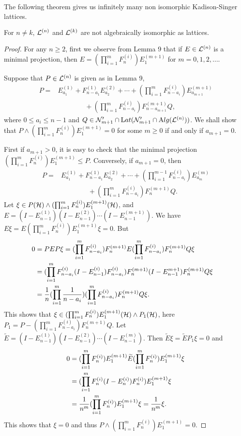 The following theorem gives us infinitely many non isomorphic
Kadison-Singer lattices.

\begin{theorem}
For $n\neq k$,
$\mathcal L^{(n)}$ and $\mathcal L^{(k)}$ are not algebraically isomorphic as
lattices.
\end{theorem}

\begin{proof}
For any $n\geq 2$, first we observe
from Lemma 9 that if $E \in \mathcal L^{(n)}$ is a minimal projection,
then $E= (\prod_{i = 1}^{m}F_{n}^{(i)})E_{1}^{(m+1)}$ for $m =0,
1, 2, \ldots$.

Suppose that $P \in \mathcal L^{(n)}$ is given as in Lemma 9,
\begin{align*}
P = &E_{a_{1}}^{(1)} + F_{n-a_{1}}^{(1)}E_{a_{2}}^{(2)} + \cdots
+(\prod_{i = 1}^{m}F_{n-a_{i}}^{(i)})E_{a_{m+1}}^{(m+1)} \\
& \qquad \qquad+ 
(\prod_{i = 1}^{m}F_{n-a_{i}}^{(i)})F_{n-a_{m+1}}^{(m+1)}Q,
\end{align*}
where $0 \leq a_{i} \leq n-1$ and $Q \in \mathcal N_{m+1}' \cap
\mathrm Lat({\mathcal N}_{m+1}' \cap \mathrm Alg(\mathcal L^{(n)}))$. We shall show that $P
\wedge (\prod_{i = 1}^{m}F_{n}^{(i)})E_{1}^{(m+1)} = 0$ for some
$m\geq 0$ if and only if $a_{m+1} = 0$.

First if $a_{m+1} > 0$, it is easy to check that the minimal
projection $(\prod_{i = 1}^{m}F_{n}^{(i)})E_{1}^{(m+1)} \leq P$.
Conversely, if $a_{m+1} = 0$, then
\begin{align*}
P = &E_{a_{1}}^{(1)} + F_{n-a_{1}}^{(1)}E_{a_{2}}^{(2)} + \cdots +
(\prod_{i=1}^{m-1}F_{n-a_{i}}^{(i)})E_{a_{m}}^{(m)}\\
& \qquad \qquad +(\prod_{i=1}^{m}F_{n-a_{i}}^{(i)})F_{n}^{(m+1)}Q.
\end{align*}
Let $\xi \in P(\mathcal H) \wedge (\prod_{i =
1}^{m}F_{n}^{(i)})E_{1}^{(m+1)}(\mathcal H)$, and $E =
(I-E_{n-1}^{(1)})(I-E_{n-1}^{(2)})\cdots(I-E_{n-1}^{(m+1)})$. We
have $E\xi = E(\prod_{i = 1}^{m}F_{n}^{(i)})E_{1}^{(m+1)}\xi = 0$.
But
\begin{align*}
0 &= PEP\xi =(\prod_{i=1}^{m}F_{n-a_{i}}^{(i)})F_{n}^{(m+1)}
E(\prod_{i=1}^{m}F_{n-a_{i}}^{(i)})F_{n}^{(m+1)}Q\xi\cr
&=(\prod_{i=1}^{m}F_{n-a_{i}}^{(i)}(I-E_{n-1}^{(i)})
F_{n-a_{i}}^{(i)})F_{n}^{(m+1)}(I-E_{n-1}^{m+1})
F_{n}^{(m+1)}Q\xi\cr
&=\frac{1}{n}(\prod_{i=1}^{m}\frac{1}{n-a_{i}})
(\prod_{i=1}^{m}F_{n-a_{i}}^{(i)})F_{n}^{(m+1)}Q\xi.
\end{align*}
This shows that $\xi \in (\prod_{i =
1}^{m}F_{n}^{(i)})E_{1}^{(m+1)}(\mathcal H) \wedge P_{1}(\mathcal H)$, here $P_{1}
= P - (\prod_{i=1}^{m}F_{n-a_{i}}^{(i)})F_{n}^{(m+1)}Q$. Let
$\widetilde{E} =
(I-E_{n-1}^{(1)})(I-E_{n-1}^{(2)})\cdots(I-E_{n-1}^{(m)})$. Then
$\widetilde{E}\xi = \widetilde{E}P_{1}\xi = 0$ and
\begin{align*}
0 &= (\prod_{i =
1}^{m}F_{n}^{(i)})E_{1}^{(m+1)}\widetilde{E}(\prod_{i =
1}^{m}F_{n}^{(i)})E_{1}^{(m+1)}\xi \\
&=(\prod_{i =
1}^{m}F_{n}^{(i)}(I-E_{n}^{(i)})F_{n}^{(i)})E_{1}^{(m+1)}\xi\cr
  &= \frac{1}{n^{m}}(\prod_{i = 1}^{m}F_{n}^{(i)})E_{1}^{(m+1)}\xi
  = \frac{1}{n^{m}}\xi.
\end{align*}
This shows that $\xi = 0$ and thus $P \wedge (\prod_{i =
1}^{m}F_{n}^{(i)})E_{1}^{(m+1)} = 0$.


\end{proof}
